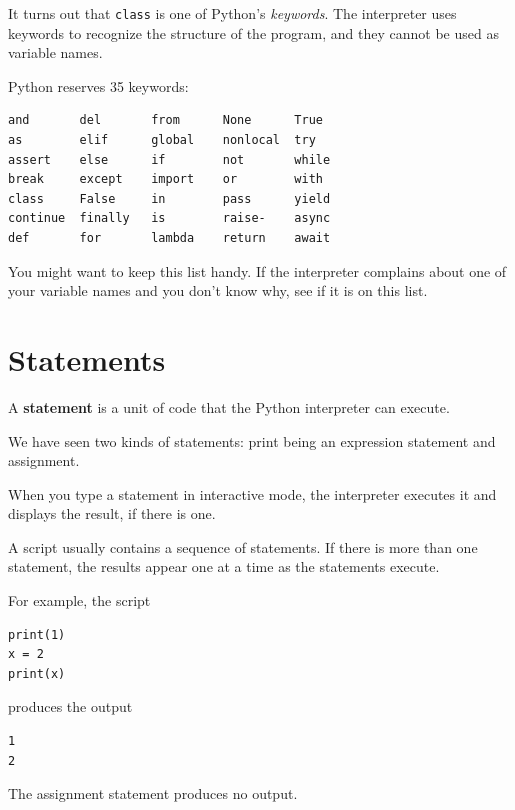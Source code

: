 It turns out that \texttt{class} is one of Python's \emph{keywords}. The interpreter uses keywords to recognize the structure of the program, and they cannot be used as variable names.


Python reserves 35 keywords:

\begin{verbatim}
and       del       from      None      True
as        elif      global    nonlocal  try
assert    else      if        not       while
break     except    import    or        with
class     False     in        pass      yield
continue  finally   is        raise-    async
def       for       lambda    return    await
\end{verbatim}

You might want to keep this list handy. If the interpreter complains about one of your variable names and you don't know why, see if it is on this list.

\hypertarget{instrucciones}{%
\section{Statements}\label{sentencias}}

\begin{definition}
A \textbf{statement} is a unit of code that the Python interpreter can execute.
\end{definition}

We have seen two kinds of statements: print being an expression statement and assignment.

  

When you type a statement in interactive mode, the interpreter executes it and displays the result, if there is one.

A script usually contains a sequence of statements. If there is more than one statement, the results appear one at a time as the statements execute.

For example, the script

\begin{Verbatim}[frame=single]
print(1)
x = 2
print(x)
\end{Verbatim}

produces the output

\begin{verbatim}
1
2
\end{verbatim}

The assignment statement produces no output.

